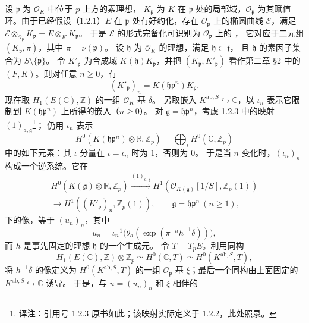 设 $\mathfrak p$ 为 $\mathcal O_K$ 中位于 $p$ 上方的素理想，
$K_{\mathfrak p}$ 为 $K$ 在 $\mathfrak p$ 处的局部域，$\mathcal O_{\mathfrak p}$
为其赋值环。由于已经假设（1.2.1）$E$ 在 $\mathfrak p$ 处有好约化，存在
$\mathcal O_{\mathfrak p}$ 上的椭圆曲线 $\mathcal E$，满足
$\mathcal E\otimes_{\mathcal O_{\mathfrak p}}K_{\mathfrak p}=E\otimes_KK_{\mathfrak p}$。
于是 $\mathcal E$ 的形式完备化可识别为 $\mathcal O_{\mathfrak p}$ 上的
，
它对应于二元组 $(K_{\mathfrak p},\pi)$，其中 $\pi=\nu(\mathfrak p)$。
设 $\mathfrak h$ 为 $\mathcal O_K$ 的理想，满足 $\mathfrak h\subset\mathfrak f$，
且 $\mathfrak h$ 的素因子集合为 $S\setminus\{\mathfrak p\}$。
令 $K'_{\mathfrak p}$ 为合成域 $K(\mathfrak h)K_{\mathfrak p}$，并把
$(K_{\mathfrak p},K'_{\mathfrak p})$ 看作第二章 §2 中的 $(F,K)$。则对任意 $n\geq0$，有
\[
(K'_{\mathfrak p})_n=K(\mathfrak h\mathfrak p^n)K_{\mathfrak p}.
\]
现在取 $H_1(E(\mathbb C),\mathbb Z)$ 的一组 $\mathcal O_K$ 基 $\delta$。
另取嵌入 $K^{\mathrm{ab},S}\hookrightarrow\mathbb C$，以 $\iota_n$ 表示它限制到
$K(\mathfrak h\mathfrak p^n)$ 上所得的嵌入（$n\geq0$）。
对 $\mathfrak g=\mathfrak h\mathfrak p^n$，考虑 1.2.3 中的映射 $(1)_{a,\mathfrak g}$\footnote{译注：引用号 1.2.3 原书如此；该映射实际定义于 1.2.2，此处照录。}；
仍用 $\iota_n$ 表示
\[
H^0(K(\mathfrak h\mathfrak p^n)\otimes\mathbb R,\mathbb Z_p)
=\bigoplus_\iota H^0(\mathbb C,\mathbb Z_p)
\]
中的如下元素：其 $\iota$ 分量在 $\iota=\iota_n$ 时为 $1$，否则为 $0$。
于是当 $n$ 变化时，$(\iota_n)_n$ 构成一个逆系统。它在
\[
\begin{gathered}
H^0(K(\mathfrak g)\otimes\mathbb R,\mathbb Z_p)
\xrightarrow{(1)_{a,\mathfrak g}}
H^1(\mathcal O_{K(\mathfrak g)}[1/S],\mathbb Z_p(1))\\
\longrightarrow H^1((K'_{\mathfrak p})_n,\mathbb Z_p(1)),
\qquad\mathfrak g=\mathfrak h\mathfrak p^n\ (n\geq1),
\end{gathered}
\]
下的像，等于
$(u_n)_n$，其中
\[
u_n=\iota_n^{-1}\bigl(\theta_a(\exp(\pi^{-n}h^{-1}\delta))\bigr),
\]
而 $h$ 是事先固定的理想 $\mathfrak h$ 的一个生成元。
令 $T=T_pE$。利用同构
\[
H_1(E(\mathbb C),\mathbb Z)\otimes\mathbb Z_p
\simeq H^0(\mathbb C,T)\simeq H^0(K^{\mathrm{ab},S},T),
\]
将 $h^{-1}\delta$ 的像定义为 $H^0(K^{\mathrm{ab},S},T)$ 的一组
$\mathcal O_{\mathfrak p}$ 基 $\xi$；最后一个同构由上面固定的
$K^{\mathrm{ab},S}\hookrightarrow\mathbb C$ 诱导。
于是，与 $u=(u_n)_n$ 和 $\xi$ 相伴的
